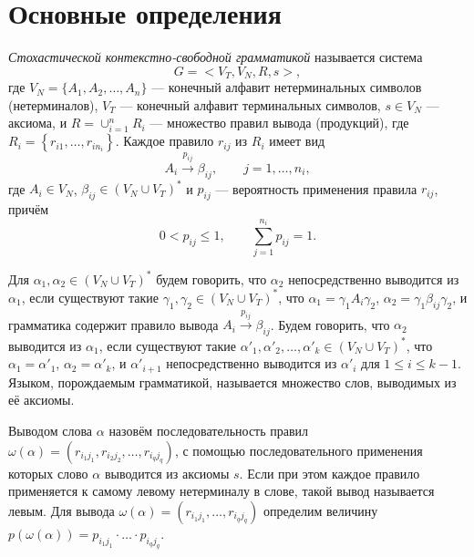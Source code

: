 \documentclass[10pt]{article}
\renewcommand{\leq}{\leqslant}
\begin{document}
\section{Основные определения}

\textit{Стохастической контекстно-свободной грамматикой} \cite{fu-struct} называется система
\begin{equation*}
    G = <V_T, V_N, R, s>,
\end{equation*}
где $V_N = \{A_1, A_2, \ldots, A_n\}$ --- конечный алфавит нетерминальных символов (нетерминалов), $V_T$ --- конечный алфавит терминальных символов, $s \in V_N$ --- аксиома, и $R = \cup_{i=1}^n R_i$ --- множество правил вывода (продукций), где $R_i = \left\{r_{i1}, \ldots, r_{i n_i}\right\}$. Каждое правило $r_{ij}$ из $R_i$ имеет вид
\begin{equation*}
	A_i \xrightarrow{p_{ij}} \beta_{ij},\qquad j = 1, \ldots, n_i,
\end{equation*}
где $A_i \in V_N$, $\beta_{ij} \in (V_N \cup V_T)^*$ и $p_{ij}$ --- вероятность применения правила $r_{ij}$, причём
\begin{equation}
\label{eq:p_values}
	0 < p_{ij} \leq 1,\qquad \sum_{j = 1}^{n_i} p_{ij} = 1.
\end{equation}

Для $\alpha_1, \alpha_2 \in (V_N \cup V_T)^*$ будем говорить, что $\alpha_2$ непосредственно выводится из $\alpha_1$, если существуют такие $\gamma_1, \gamma_2 \in (V_N \cup V_T)^*$, что $\alpha_1 = \gamma_1 A_i \gamma_2$, $\alpha_2 = \gamma_1 \beta_{ij} \gamma_2$, и грамматика содержит правило вывода $A_i \xrightarrow{p_{ij}} \beta_{ij}$. Будем говорить, что $\alpha_2$ выводится из $\alpha_1$, если существуют такие $\alpha'_1, \alpha'_2, \ldots, \alpha'_k \in (V_N \cup V_T)^*$, что $\alpha_1 = \alpha'_1$, $\alpha_2 = \alpha'_k$, и $\alpha'_{i+1}$ непосредственно выводится из $\alpha'_i$ для $1 \leq i \leq k-1$. Языком, порождаемым грамматикой, называется множество слов, выводимых из её аксиомы.

Выводом слова $\alpha$ назовём последовательность правил $\omega(\alpha) = (r_{i_1 j_1}, r_{i_2 j_2}, \ldots, r_{i_q j_q})$, с помощью последовательного применения которых слово $\alpha$ выводится из аксиомы $s$. Если при этом каждое правило применяется к самому левому нетерминалу в слове, такой вывод называется левым. Для вывода $\omega(\alpha) = (r_{i_1 j_1}, \ldots, r_{i_q j_q})$ определим величину $p(\omega(\alpha)) = p_{i_1 j_1} \cdot \ldots \cdot p_{i_q j_q}$.
\end{document}
